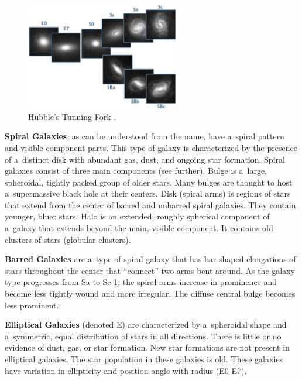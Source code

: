 \begin{figure}[htbp]
    \centering
    \includegraphics[width=0.6\textwidth]{obrazky-figures/02-theoretical-basis/tfork_upscaled.png}
    \caption{Hubble's Tunning Fork \cite{Hickson2016ASTR505}.}
    \label{fig:fork}
\end{figure}

\textbf{Spiral Galaxies}, as can be understood from the name, have a~spiral pattern and visible component parts. This type of galaxy is characterized by the presence of a~distinct disk with abundant gas, dust, and ongoing star formation. Spiral galaxies consist of three main components (see further). Bulge is a~large, spheroidal, tightly packed group of older stars. Many bulges are thought to host a~supermassive black hole at their centers. Disk (spiral arms) is regions of stars that extend from the center of barred and unbarred spiral galaxies. They contain younger, bluer stars. Halo is an extended, roughly spherical component of a~galaxy that extends beyond the main, visible component. It contains old clusters of stars (globular clusters).

\medskip

\textbf{Barred Galaxies} are a~type of spiral galaxy that has bar-shaped elongations of stars throughout the center that “connect” two arms bent around. As the galaxy type progresses from Sa to Sc \ref{fig:fork}, the spiral arms increase in prominence and become less tightly wound and more irregular. The diffuse central bulge becomes less prominent.

\medskip

\textbf{Elliptical Galaxies} (denoted E) are characterized by a~spheroidal shape and a~symmetric, equal distribution of stars in all directions. There is little or no evidence of dust, gas, or star formation. New star formations are not present in elliptical galaxies. The star population in these galaxies is old. These galaxies have variation in ellipticity and position angle with radius (E0-E7).

